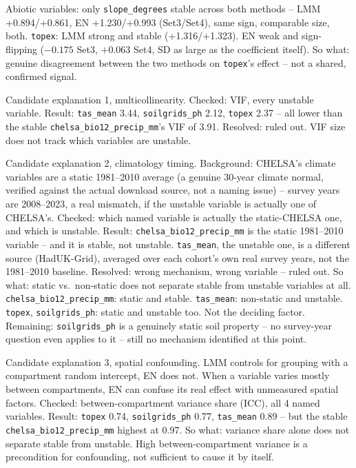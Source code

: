 \documentclass[logo,msc,ai]{infthesis}           %
\begin{document}
Abiotic variables: only \texttt{slope\_degrees} stable across both methods -- LMM
+0.894/+0.861, EN +1.230/+0.993 (Set3/Set4), same sign, comparable size, both.
\texttt{topex}: LMM strong and stable (+1.316/+1.323). EN weak and sign-flipping
($-0.175$ Set3, $+0.063$ Set4, SD as large as the coefficient itself).
So what: genuine disagreement between the two methods on \texttt{topex}'s effect --
not a shared, confirmed signal.

Candidate explanation 1, multicollinearity. Checked: VIF, every unstable variable.
Result: \texttt{tas\_mean} 3.44, \texttt{soilgrids\_ph} 2.12, \texttt{topex} 2.37 --
all lower than the stable \texttt{chelsa\_bio12\_precip\_mm}'s VIF of 3.91.
Resolved: ruled out. VIF size does not track which variables are unstable.

Candidate explanation 2, climatology timing. Background: CHELSA's climate variables
are a static 1981--2010 average (a genuine 30-year climate normal, verified against
the actual download source, not a naming issue) -- survey years are 2008--2023, a
real mismatch, if the unstable variable is actually one of CHELSA's.
Checked: which named variable is actually the static-CHELSA one, and which is
unstable. Result: \texttt{chelsa\_bio12\_precip\_mm} is the static 1981--2010
variable -- and it is stable, not unstable. \texttt{tas\_mean}, the unstable one, is
a different source (HadUK-Grid), averaged over each cohort's own real survey years,
not the 1981--2010 baseline.
Resolved: wrong mechanism, wrong variable -- ruled out.
So what: static vs.\ non-static does not separate stable from unstable variables at
all. \texttt{chelsa\_bio12\_precip\_mm}: static and stable. \texttt{tas\_mean}:
non-static and unstable. \texttt{topex}, \texttt{soilgrids\_ph}: static and
unstable too. Not the deciding factor.
Remaining: \texttt{soilgrids\_ph} is a genuinely static soil property -- no
survey-year question even applies to it -- still no mechanism identified at this
point.

Candidate explanation 3, spatial confounding. LMM controls for grouping with a
compartment random intercept, EN does not. When a variable varies mostly between
compartments, EN can confuse its real effect with unmeasured spatial factors.
Checked: between-compartment variance share (ICC), all 4 named variables. Result:
\texttt{topex} 0.74, \texttt{soilgrids\_ph} 0.77, \texttt{tas\_mean} 0.89 -- but the
stable \texttt{chelsa\_bio12\_precip\_mm} highest at 0.97.
So what: variance share alone does not separate stable from unstable. High
between-compartment variance is a precondition for confounding, not sufficient to
cause it by itself.
\end{document}
